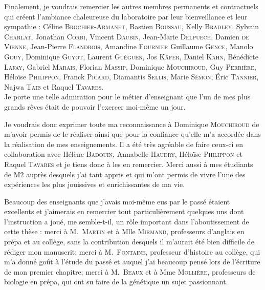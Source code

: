 Finalement, je voudrais remercier les autres membres permanents et contractuels qui créent l'ambiance chaleureuse du laboratoire par leur bienveillance et leur sympathie : 
Céline \textsc{Brochier-Armanet},
Bastien \textsc{Boussau},
Kelly \textsc{Bradley},
Sylvain \textsc{Charlat},
Jonathan \textsc{Corbi},
Vincent \textsc{Daubin},
Jean-Marie \textsc{Delpuech},
Damien \textsc{de Vienne},
Jean-Pierre \textsc{Flandrois},
Amandine \textsc{Fournier}
Guillaume \textsc{Gence},
Manolo \textsc{Gouy},
Dominique \textsc{Guyot},
Laurent \textsc{Guéguen},
Jos \textsc{Käfer},
Daniel \textsc{Kahn},
Bénédicte \textsc{Lafay},
Gabriel \textsc{Marais},
Florian \textsc{Massip},
Dominique \textsc{Mouchiroud},
Guy \textsc{Perrière},
Héloïse \textsc{Philippon},
Franck \textsc{Picard},
Diamantis \textsc{Sellis},
Marie \textsc{Sémon},
\'Eric \textsc{Tannier},
Najwa \textsc{Taib} et
Raquel \textsc{Tavares}.\\




%




Je porte une telle admiration pour le métier d'enseignant que l'un de mes plus grands rêves était de pouvoir l'exercer moi-même un jour.

Je voudrais donc exprimer toute ma reconnaissance à Dominique \textsc{Mouchiroud} de m'avoir permis de le réaliser ainsi que pour la confiance qu'elle m'a accordée dans la réalisation de mes enseignements.
Il a été très agréable de faire ceux-ci en collaboration avec Hélène \textsc{Badouin}, Annabelle \textsc{Haudry}, Héloïse \textsc{Philippon} et Raquel \textsc{Tavares} et je tiens donc à les en remercier.
Merci aussi à mes étudiants de M2 auprès desquels j'ai tant appris et qui m'ont permis de vivre l'une des expériences les plus jouissives et enrichissantes de ma vie.

Beaucoup des enseignants que j'avais moi-même eus par le passé étaient excellents et j'aimerais en remercier tout particulièrement quelques uns dont l'instruction a joué, me semble-t-il, un rôle important dans l'aboutissement de cette thèse : 
merci à M.\ \textsc{Martin} et à Mlle \textsc{Mirmand}, professeurs d'anglais en prépa et au collège, sans la contribution desquels il m'aurait été bien difficile de rédiger mon manuscrit; 
merci à M.\ \textsc{Fontaine}, professeur d'histoire au collège, qui m'a donné goût à l'étude du passé et auquel j'ai beaucoup pensé lors de l'écriture de mon premier chapitre; 
merci à M.\ \textsc{Beaux} et à Mme \textsc{Mollière}, professeurs de biologie en prépa, qui ont su faire de la génétique un sujet passionnant.

